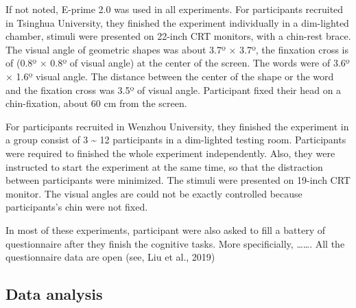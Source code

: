 \documentclass[man]{apa6}
\begin{document}
If not noted, E-prime 2.0 was used in all experiments. For participants recruited in Tsinghua University, they finished the experiment individually in a dim-lighted chamber, stimuli were presented on 22-inch CRT monitors, with a chin-rest brace. The visual angle of geometric shapes was about 3.7º × 3.7º, the finxation cross is of (0.8º × 0.8º of visual angle) at the center of the screen. The words were of 3.6º × 1.6º visual angle. The distance between the center of the shape or the word and the fixation cross was 3.5º of visual angle. Participant fixed their head on a chin-fixation, about 60 cm from the screen.

For participants recruited in Wenzhou University, they finished the experiment in a group consist of 3 \textasciitilde{} 12 participants in a dim-lighted testing room. Participants were required to finished the whole experiment independently. Also, they were instructed to start the experiment at the same time, so that the distraction between participants were minimized. The stimuli were presented on 19-inch CRT monitor. The visual angles are could not be exactly controlled because participants's chin were not fixed.

In most of these experiments, participant were also asked to fill a battery of questionnaire after they finish the cognitive tasks. More specificially, \ldots{}\ldots{}. All the questionnaire data are open (see, Liu et al., 2019)

\hypertarget{data-analysis}{%
\subsection{Data analysis}\label{data-analysis}}
\end{document}
